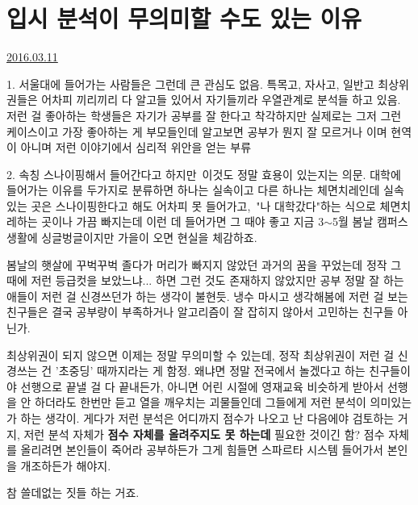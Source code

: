 \section{입시 분석이 무의미할 수도 있는 이유}
\href{https://www.kockoc.com/Apoc/673033}{2016.03.11}

\vspace{5mm}

\item 1. 서울대에 들어가는 사람들은 그런데 큰 관심도 없음.
특목고, 자사고, 일반고 최상위권들은 어차피 끼리끼리 다 알고들 있어서 자기들끼라 우열관계로 분석들 하고 있음.
저런 걸 좋아하는 학생들은 자기가 공부를 잘 한다고 착각하지만 실제로는 그저 그런 케이스이고
가장 좋아하는 게 부모들인데 알고보면 공부가 뭔지 잘 모르거나 이며 현역이 아니며 저런 이야기에서 심리적 위안을 얻는 부류
\vspace{5mm}

\item 2. 속칭 스나이핑해서 들어간다고 하지만 이것도 정말 효용이 있는지는 의문.
대학에 들어가는 이유를 두가지로 분류하면 하나는 실속이고 다른 하나는 체면치레인데
실속있는 곳은 스나이핑한다고 해도 어차피 못 들어가고, "나 대학갔다"하는 식으로 체면치레하는 곳이나 가끔 빠지는데
이런 데 들어가면 그 때야 좋고 지금 3$\sim$5월 봄날 캠퍼스 생활에 싱글벙글이지만 가을이 오면 현실을 체감하죠.
\vspace{5mm}

봄날의 햇살에 꾸벅꾸벅 졸다가 머리가 빠지지 않았던 과거의 꿈을 꾸었는데
정작 그 때에 저런 등급컷을 보았느냐... 하면 그런 것도 존재하지 않았지만 공부 정말 잘 하는 애들이 저런 걸 신경쓰던가 하는 생각이 불현듯.
냉수 마시고 생각해봄에 저런 걸 보는 친구들은 결국 공부량이 부족하거나 알고리즘이 잘 잡히지 않아서 고민하는 친구들 아닌가.
\vspace{5mm}

최상위권이 되지 않으면 이제는 정말 무의미할 수 있는데, 정작 최상위권이 저런 걸 신경쓰는 건 '초중딩' 때까지라는 게 함정.
왜냐면 정말 전국에서 놀겠다고 하는 친구들이야 선행으로 끝낼 걸 다 끝내든가, 아니면 어린 시절에 영재교육 비슷하게 받아서
선행을 안 하더라도 한번만 듣고 열을 깨우치는 괴물들인데 그들에게 저런 분석이 의미있는가 하는 생각이.
게다가 저런 분석은 어디까지 점수가 나오고 난 다음에야 검토하는 거지,
저런 분석 자체가 \textbf{점수 자체를 올려주지도 못 하는데} 필요한 것이긴 함?
점수 자체를 올리려면 본인들이 죽어라 공부하든가 그게 힘들면 스파르타 시스템 들어가서 본인을 개조하든가 해야지.
\vspace{5mm}

참 쓸데없는 짓들 하는 거죠.
\vspace{5mm}

